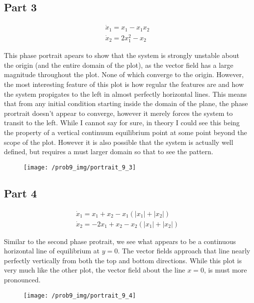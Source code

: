 \subsection*{Part 3}

$$
\begin{array}{l}
\dot{x}_{1}=x_{1}-x_{1} x_{2} \\
\dot{x}_{2}=2 x_{1}^{2}-x_{2}
\end{array}
$$

\noindent This phase portrait apears to show that the system is strongly unstable about the origin (and the entire domain of the plot), as the vector field has a large magnitude throughout the plot. None of which converge to the origin. However, the most interesting feature of this plot is how regular the features are and how the system propigates to the left in almost perfectly horizontal lines. This means that from any initial condition starting inside the domain of the plane, the phase prortrait doesn't appear to converge, however it merely forces the system to transit to the left. While I cannot say for sure, in theory I could see this being the property of a vertical continuum equilibrium point at some point beyond the scope of the plot. However it is also possible that the system is actually well defined, but requires a must larger domain so that to see the pattern.

\begin{figure}[hb!]
  \centering

  \texttt{[image: /prob9\_img/portrait\_9\_3]}
\end{figure}


\subsection*{Part 4}

$$
\begin{array}{l}
\dot{x}_{1}=x_{1}+x_{2}-x_{1}\left(\left|x_{1}\right|+\left|x_{2}\right|\right) \\
\dot{x}_{2}=-2 x_{1}+x_{2}-x_{2}\left(\left|x_{1}\right|+\left|x_{2}\right|\right)
\end{array}
$$

\noindent Similar to the second phase protrait, we see what appears to be a continuous horizontal line of equilibrium at $y=0$. The vector fields approach that line nearly perfectly vertically from both the top and bottom directions. While this plot is very much like the other plot, the vector field about the line $x = 0$, is must more pronounced.

\begin{figure}[h]
  \centering
  \texttt{[image: /prob9\_img/portrait\_9\_4]}
\end{figure}
